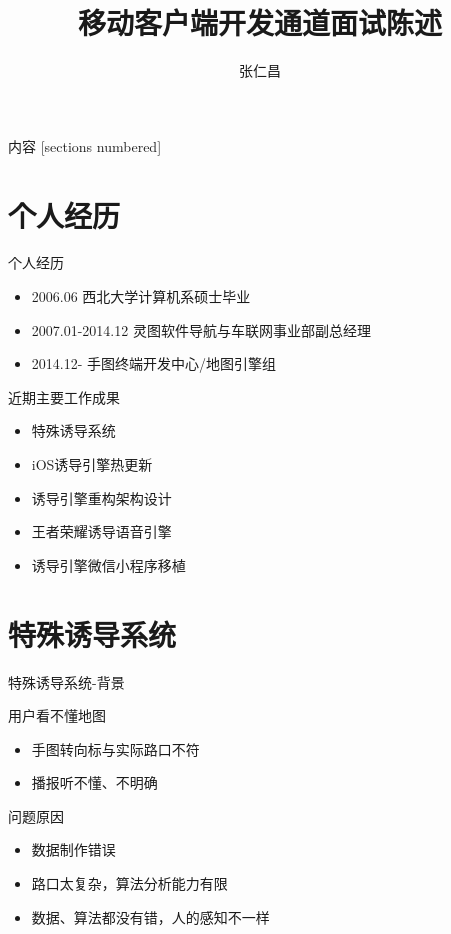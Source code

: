 \documentclass[10pt]{beamer}
\title{移动客户端开发通道面试陈述}
\author{张仁昌}
\institute{地图平台部/手图终端开发中心/地图引擎组}
\begin{document}
\maketitle

\begin{frame}{内容}
	[sections numbered]
	\tableofcontents[hideallsubsections]
\end{frame}

\section{个人经历}

\begin{frame}[fragile]{个人经历}
	\begin{itemize}
		\item 2006.06 西北大学计算机系硕士毕业
		\item 2007.01-2014.12 灵图软件导航与车联网事业部副总经理
		\item 2014.12- 手图终端开发中心/地图引擎组
	\end{itemize}
\end{frame}

\begin{frame}[fragile]{近期主要工作成果}
	\begin{exampleblock}{}
		\begin{itemize}
			\item 特殊诱导系统
			\item iOS诱导引擎热更新
            \item 诱导引擎重构架构设计
            \item 王者荣耀诱导语音引擎
			\item 诱导引擎微信小程序移植
		\end{itemize}
	\end{exampleblock}
\end{frame}

\section{特殊诱导系统}
\begin{frame}{特殊诱导系统-背景}
	\begin{exampleblock}{用户看不懂地图}
		\begin{itemize}
			\item 手图转向标与实际路口不符
			\item 播报听不懂、不明确
		\end{itemize}
	\end{exampleblock}
	\begin{exampleblock}{问题原因}
		\begin{itemize}
			\item 数据制作错误
			\item 路口太复杂，算法分析能力有限
			\item 数据、算法都没有错，人的感知不一样
		\end{itemize}
	\end{exampleblock}
\end{frame}
\end{document}
